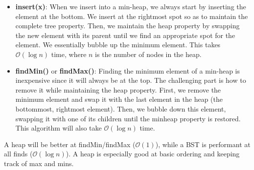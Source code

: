 \documentclass{article}
\newcommand{\bigO}{\ensuremath{\mathcal{O}}}
\begin{document}
    \begin{itemize}
        \item \textbf{insert(x)}: When we insert into a min-heap, we always start by inserting the element at the bottom. We insert at the rightmost spot so as to maintain the complete tree property. Then, we maintain the heap property by swapping the new element with its parent until we find an appropriate spot for the element. We essentially bubble up the minimum element. This takes $\bigO (\log n)$ time, where $n$ is the number of nodes in the heap. 
        
        \item \textbf{findMin()} or \textbf{findMax()}: Finding the minimum element of a min-heap is inexpensive since it will always be at the top. The challenging part is how to remove it while maintaining the heap property. First, we remove the minimum element and swap it with the last element in the heap (the bottommost, rightmost element). Then, we bubble down this element, swapping it with one of its children until the minheap property is restored. This algorithm will also take $\bigO( \log n)$ time. 
    \end{itemize}
    
    A heap will be better at findMin/findMax ($\bigO(1)$), while a BST is performant at all finds ($\bigO(\log n)$). A heap is especially good at basic ordering and keeping track of max and mins.
\end{document}
